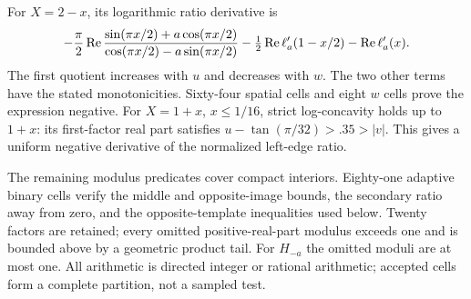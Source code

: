\documentclass[11pt,a4paper]{article}
\begin{document}
For $X=2-x$, its logarithmic ratio derivative is
\[
 -\frac\pi2\operatorname{Re}\frac{\sin(\pi x/2)+a\cos(\pi x/2)}
 {\cos(\pi x/2)-a\sin(\pi x/2)}
 -\tfrac12\operatorname{Re}\ell_a'(1-x/2)-\operatorname{Re}\ell_a'(x).
\]
The first quotient increases with $u$ and decreases with $w$. The two other terms have the stated monotonicities. Sixty-four spatial cells and eight $w$ cells prove the expression negative. For $X=1+x$, $x\le1/16$, strict log-concavity holds up to $1+x$: its first-factor real part satisfies $u-\tan(\pi/32)>.35>|v|$. This gives a uniform negative derivative of the normalized left-edge ratio.

The remaining modulus predicates cover compact interiors. Eighty-one adaptive binary cells verify the middle and opposite-image bounds, the secondary ratio away from zero, and the opposite-template inequalities used below. Twenty factors are retained; every omitted positive-real-part modulus exceeds one and is bounded above by a geometric product tail. For $H_{-a}$ the omitted moduli are at most one. All arithmetic is directed integer or rational arithmetic; accepted cells form a complete partition, not a sampled test.
\end{document}
